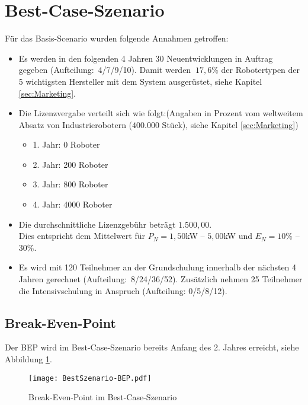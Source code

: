 \section{Best-Case-Szenario}
Für das Basis-Scenario wurden folgende Annahmen getroffen:
\begin{itemize}
	\item Es werden in den folgenden 4 Jahren 30 Neuentwicklungen in Auftrag gegeben (Aufteilung:~4/7/9/10). Damit werden $~17,6$\% der Robotertypen der 5 wichtigsten Hersteller mit dem System ausgerüstet, siehe Kapitel \ref{sec:Marketing}.
	\item Die Lizenzvergabe verteilt sich wie folgt:\newline (Angaben in Prozent vom weltweitem Absatz von Industrierobotern ($400.000$ Stück), siehe Kapitel \ref{sec:Marketing})
	\begin{itemize}
		\item 1. Jahr: 0 Roboter
		\item 2. Jahr: 200 Roboter
		\item 3. Jahr: 800 Roboter
		\item 4. Jahr: 4000 Roboter
	\end{itemize}
	\item Die durchschnittliche Lizenzgebühr beträgt $1.500,00$\officialeuro.\\ Dies entspricht dem Mittelwert für $P_N = 1,50$kW -- $5,00$kW und $E_N = 10$\% -- $30$\%.
	\item Es wird mit 120 Teilnehmer an der Grundschulung innerhalb der nächsten 4 Jahren gerechnet (Aufteilung:~8/24/36/52). Zusätzlich nehmen 25 Teilnehmer die Intensivschulung in Anspruch (Aufteilung: 0/5/8/12).
\end{itemize}

\subsection{Break-Even-Point}
Der BEP wird im Best-Case-Szenario bereits Anfang des 2. Jahres erreicht, siehe Abbildung \ref{fig:BestSzenario-BEP}.
\begin{figure}[h]
	\centering
	\texttt{[image: BestSzenario-BEP.pdf]}
	\caption{Break-Even-Point im Best-Case-Szenario}
	\label{fig:BestSzenario-BEP}
\end{figure}

